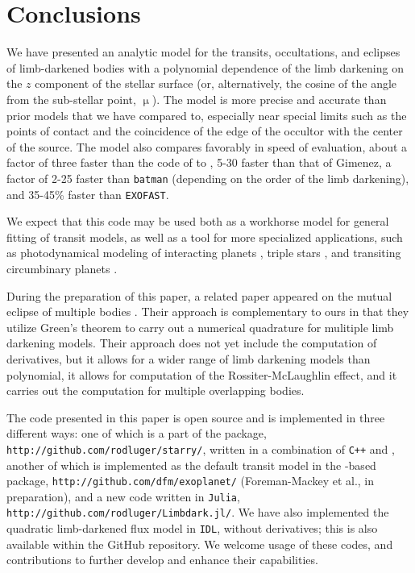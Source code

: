\documentclass[modern,trackchanges]{aastex63}
\newcommand{\edited}{}
\begin{document}
\section{Conclusions}
\label{sec:conclusions}

We have presented an analytic model for the transits, occultations, and
eclipses of limb-darkened bodies with a polynomial dependence of the limb darkening
on the $z$ component of the stellar surface (or, alternatively, the
cosine of the angle from the sub-stellar point, $\upmu$).  The model is more precise
and accurate than prior models that we have compared to, especially near
special limits such as the points of contact and the coincidence of the edge
of the occultor with the center of the source.  The model also compares favorably in
speed of evaluation, about a factor of three faster than the code of
to \citet{Pal2008}, 5-30 faster than that of Gimenez, a factor of 2-25 faster than \texttt{batman}
(depending on the order of the limb darkening), and 35-45\% faster than \texttt{EXOFAST}.

We expect that this code may be used both as a workhorse model for
general fitting of transit models, as well as a tool for more
specialized applications, such as photodynamical modeling of
interacting planets \citep{Carter2012}, triple stars \citep{Carter2011}, and
transiting circumbinary planets \citep{Doyle2011}.

During the preparation of this paper, a related paper appeared on
the mutual eclipse of multiple bodies \citep{Short2018}.  Their
approach is complementary to ours in that they utilize Green's theorem to
carry out a numerical quadrature for mulitiple limb darkening models.
Their approach does not yet include the computation of derivatives, but
it allows for a wider range of limb darkening models than polynomial, it
allows for computation of the Rossiter-McLaughlin effect, and it
carries out the computation for multiple overlapping bodies.

The code presented in this paper is open source and is implemented in \edited{three} 
different ways: one of which is a part
of the \starry package, \texttt{http://github.com/rodluger/starry/}, written
in a combination of \texttt{C++} and \Python, 
\edited{another of which is implemented as the default transit model in the 
\Python-based \exoplanet package,
\texttt{http://github.com/dfm/exoplanet/} (Foreman-Mackey et al., in preparation),}
and a new code written in \texttt{Julia},
\texttt{http://github.com/rodluger/Limbdark.jl/}.  We have also implemented
the {\edited quadratic limb-darkened} flux model in \texttt{IDL}, without derivatives; 
this is also available within the GitHub repository. We welcome usage of these
codes, and contributions to further develop and enhance their capabilities.
\end{document}
